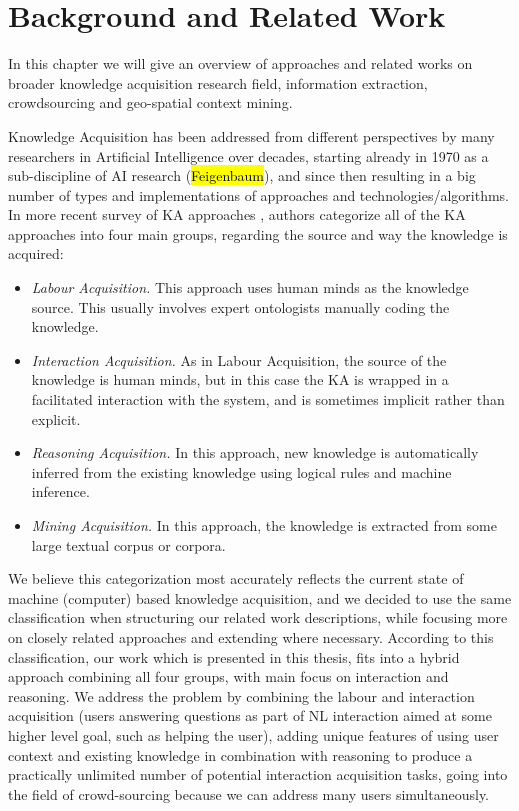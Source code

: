 \chapter{Background and Related Work}

In this chapter we will give an overview of approaches and related works on broader knowledge acquisition research field, information extraction, crowdsourcing and geo-spatial context mining. 

Knowledge Acquisition has been addressed from different perspectives by many researchers in Artificial Intelligence over decades, starting already in 1970 as a sub-discipline of AI research (\hl{Feigenbaum}), and since then resulting in a big number of types and implementations of approaches and technologies/algorithms. In more recent survey of KA approaches \parencite{Zang2013}, authors categorize all of the KA approaches into four main groups, regarding the source and way the knowledge is acquired:
\begin{itemize}
	\item \emph{Labour Acquisition.} This approach uses human minds as the knowledge source. This usually involves expert ontologists manually coding the knowledge.
	\item \emph{Interaction Acquisition.} As in Labour Acquisition, the source of the knowledge is human minds, but in this case the KA is wrapped in a facilitated interaction with the system, and is sometimes implicit rather than explicit.
	\item \emph{Reasoning Acquisition.} In this approach, new knowledge is automatically inferred from the existing knowledge using logical rules and machine inference.
	\item \emph{Mining Acquisition.} In this approach, the knowledge is extracted from some large textual corpus or corpora.
\end{itemize}

We believe this categorization most accurately reflects the current state of machine (computer) based knowledge acquisition, and we decided to use the same classification when structuring our related work descriptions, while focusing more on closely related approaches and extending where necessary. According to this classification, our work which is presented in this thesis, fits into a hybrid approach combining all four groups, with main focus on interaction and reasoning. We address the problem by combining the labour and interaction acquisition (users answering questions as part of NL interaction aimed at some higher level goal, such as helping the user), adding unique features of using user context and existing knowledge in combination with reasoning to produce a practically unlimited number of potential interaction acquisition tasks, going into the field of crowd-sourcing because we can address many users simultaneously.
 
